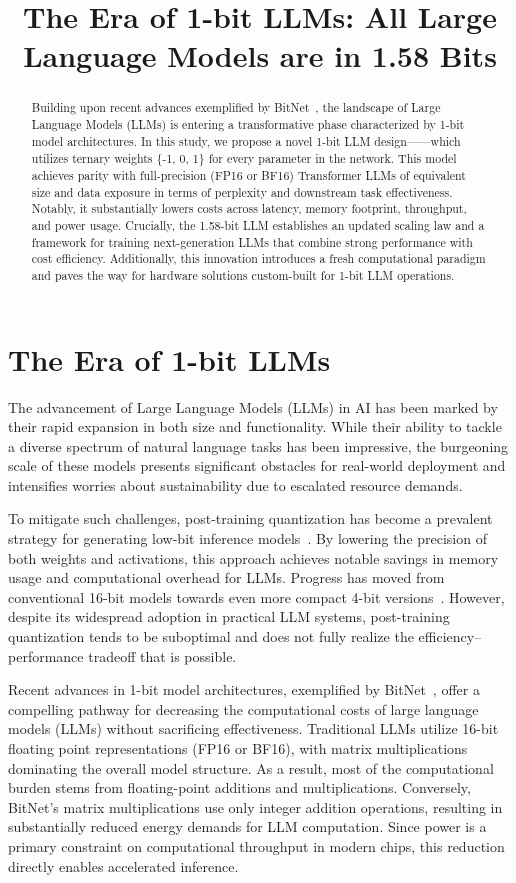 \title{The Era of 1-bit LLMs: All Large Language Models are in 1.58 Bits}

\begin{abstract}
Building upon recent advances exemplified by BitNet~\cite{bitnet}, the landscape of Large Language Models (LLMs) is entering a transformative phase characterized by 1-bit model architectures. In this study, we propose a novel 1-bit LLM design—\textbf{}—which utilizes ternary weights \{-1, 0, 1\} for every parameter in the network. This model achieves parity with full-precision (FP16 or BF16) Transformer LLMs of equivalent size and data exposure in terms of perplexity and downstream task effectiveness. Notably, it substantially lowers costs across latency, memory footprint, throughput, and power usage. Crucially, the 1.58-bit LLM establishes an updated scaling law and a framework for training next-generation LLMs that combine strong performance with cost efficiency. Additionally, this innovation introduces a fresh computational paradigm and paves the way for hardware solutions custom-built for 1-bit LLM operations.
\end{abstract}

\section{The Era of 1-bit LLMs}

The advancement of Large Language Models (LLMs) in AI has been marked by their rapid expansion in both size and functionality. While their ability to tackle a diverse spectrum of natural language tasks has been impressive, the burgeoning scale of these models presents significant obstacles for real-world deployment and intensifies worries about sustainability due to escalated resource demands.

To mitigate such challenges, post-training quantization has become a prevalent strategy for generating low-bit inference models~\cite{smoothquant, gptq, quip, quip_sharp}. By lowering the precision of both weights and activations, this approach achieves notable savings in memory usage and computational overhead for LLMs. Progress has moved from conventional 16-bit models towards even more compact 4-bit versions~\cite{gptq, awq}. However, despite its widespread adoption in practical LLM systems, post-training quantization tends to be suboptimal and does not fully realize the efficiency–performance tradeoff that is possible.

Recent advances in 1-bit model architectures, exemplified by BitNet~\cite{bitnet}, offer a compelling pathway for decreasing the computational costs of large language models (LLMs) without sacrificing effectiveness. Traditional LLMs utilize 16-bit floating point representations (FP16 or BF16), with matrix multiplications dominating the overall model structure. As a result, most of the computational burden stems from floating-point additions and multiplications. Conversely, BitNet’s matrix multiplications use only integer addition operations, resulting in substantially reduced energy demands for LLM computation. Since power is a primary constraint on computational throughput in modern chips, this reduction directly enables accelerated inference.

